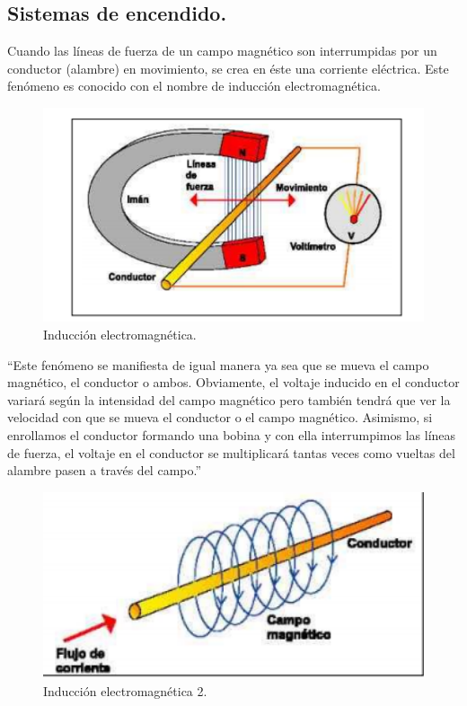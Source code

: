 \subsection{Sistemas de encendido.}

Cuando las líneas de fuerza de un campo magnético son
interrumpidas por un conductor (alambre) en movimiento, se crea en éste
una corriente eléctrica. Este fenómeno es conocido con el nombre de
inducción electromagnética.\\

\begin{figure}[H]
\centering
\includegraphics[width=12cm]{capitulo3/figs/induc.png}
\caption{ Inducción electromagnética.}
\end{figure}

``Este fenómeno se manifiesta de igual manera ya sea que se
mueva el campo magnético, el conductor o ambos. Obviamente, el voltaje
inducido en el conductor variará según la intensidad del campo magnético
pero también tendrá que ver la velocidad con que se mueva el conductor o el campo magnético. Asimismo, si enrollamos el conductor formando una
bobina y con ella interrumpimos las líneas de fuerza, el voltaje en el
conductor se multiplicará tantas veces como vueltas del alambre pasen a
través del campo.''\\

\begin{figure}[H]
\centering
\includegraphics[width=12cm]{capitulo3/figs/trans2.png}
\caption{ Inducción electromagnética 2.}
\end{figure}


